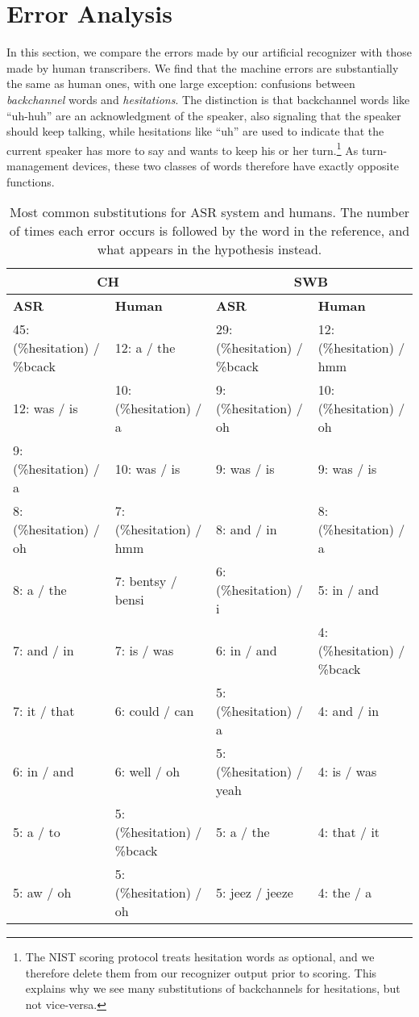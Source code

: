 \documentclass{article}
\begin{document}
\section{Error Analysis}
\label{sec:analysis}
In this section, we compare the errors made by our artificial recognizer
with those made by human transcribers.
We find that the machine errors
are substantially the same as human ones, with one large exception: confusions
between {\it backchannel} words and {\it hesitations}. The distinction is that
backchannel words like ``uh-huh'' are an acknowledgment of the speaker, also signaling 
that the speaker should keep talking,
while hesitations like ``uh'' are used to indicate that 
the current speaker has more to say and wants to keep his or her turn.\footnote{The NIST scoring protocol treats hesitation words as optional, and we therefore 
delete them from our recognizer output prior to scoring.  This explains why we see many substitutions of 
backchannels for hesitations, but not vice-versa.}
As turn-management devices, these two classes of words therefore have exactly opposite functions.
\begin{table*}[t]
    \centering
\caption{Most common substitutions for ASR system and humans. The number of
times each error occurs is followed by the word in the reference, and what
appears in the hypothesis instead.}
\vspace*{0.1in}
\label{tab:subs}
        \small
    \begin{tabular}{|l|l||l|l|}
    \hline
    \multicolumn{2}{|c||}{{\bf CH}} & \multicolumn{2}{c|}{{\bf SWB}} \\ \hline
                    {\bf ASR}   & {\bf Human}   & {\bf ASR}    & {\bf Human}   \\ \hline \hline
45:  (\%hesitation) / \%bcack & 12:  a / the & 29:  (\%hesitation) / \%bcack & 12:  (\%hesitation) / hmm \\ \hline
12:  was / is & 10:  (\%hesitation) / a &  9:  (\%hesitation) / oh & 10:  (\%hesitation) / oh \\ \hline
9:  (\%hesitation) / a & 10:  was / is &  9:  was / is &  9:  was / is \\ \hline
8:  (\%hesitation) / oh & 7:  (\%hesitation) / hmm &  8:  and / in &  8:  (\%hesitation) / a \\ \hline
8:  a / the & 7:  bentsy / bensi &  6:  (\%hesitation) / i &  5:  in / and \\ \hline
7:  and / in & 7:  is / was &  6:  in / and &  4:  (\%hesitation) / \%bcack \\ \hline
7:  it / that & 6:  could / can &  5:  (\%hesitation) / a &  4:  and / in \\ \hline
6:  in / and & 6:  well / oh &  5:  (\%hesitation) / yeah &  4:  is / was \\ \hline
5:  a / to & 5:  (\%hesitation) / \%bcack &  5:  a / the &  4:  that / it \\ \hline
5:  aw / oh & 5:  (\%hesitation) / oh &  5:  jeez / jeeze &  4:  the / a \\ \hline
        \end{tabular}
\end{table*}
\end{document}
